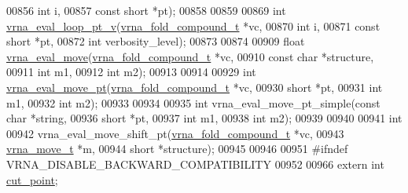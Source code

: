 \begin{DoxyCode}
00856                       \textcolor{keywordtype}{int}                   i,
00857                       \textcolor{keyword}{const} \textcolor{keywordtype}{short}           *pt);
00858 
00859 
00869 \textcolor{keywordtype}{int} \hyperlink{group__eval__loops_ga30faecaff1009fe62c58312c8d56dabb}{vrna\_eval\_loop\_pt\_v}(\hyperlink{group__fold__compound_structvrna__fc__s}{vrna\_fold\_compound\_t}  *vc,
00870                         \textcolor{keywordtype}{int}                   i,
00871                         \textcolor{keyword}{const} \textcolor{keywordtype}{short}           *pt,
00872                         \textcolor{keywordtype}{int}                   verbosity\_level);
00873 
00874 
00909 \textcolor{keywordtype}{float} \hyperlink{group__eval__move_gaff1b9e4f4d17b434b0a822fe783672c1}{vrna\_eval\_move}(\hyperlink{group__fold__compound_structvrna__fc__s}{vrna\_fold\_compound\_t} *vc,
00910                      \textcolor{keyword}{const} \textcolor{keywordtype}{char}           *structure,
00911                      \textcolor{keywordtype}{int}                  m1,
00912                      \textcolor{keywordtype}{int}                  m2);
00913 
00914 
00929 \textcolor{keywordtype}{int} \hyperlink{group__eval__move_ga123dabc119ea98c968a5e903cc46f0fb}{vrna\_eval\_move\_pt}(\hyperlink{group__fold__compound_structvrna__fc__s}{vrna\_fold\_compound\_t}  *vc,
00930                       \textcolor{keywordtype}{short}                 *pt,
00931                       \textcolor{keywordtype}{int}                   m1,
00932                       \textcolor{keywordtype}{int}                   m2);
00933 
00934 
00935 \textcolor{keywordtype}{int} vrna\_eval\_move\_pt\_simple(\textcolor{keyword}{const} \textcolor{keywordtype}{char} *\textcolor{keywordtype}{string},
00936                              \textcolor{keywordtype}{short}      *pt,
00937                              \textcolor{keywordtype}{int}        m1,
00938                              \textcolor{keywordtype}{int}        m2);
00939 
00940 
00941 \textcolor{keywordtype}{int}
00942 vrna\_eval\_move\_shift\_pt(\hyperlink{group__fold__compound_structvrna__fc__s}{vrna\_fold\_compound\_t}  *vc,
00943                         \hyperlink{group__neighbors_structvrna__move__s}{vrna\_move\_t}           *m,
00944                         \textcolor{keywordtype}{short}                 *structure);
00945 
00946 
00951 \textcolor{preprocessor}{#ifndef VRNA\_DISABLE\_BACKWARD\_COMPATIBILITY}
00952 
00966 \textcolor{keyword}{extern} \textcolor{keywordtype}{int}  \hyperlink{group__eval__deprecated_gab9b2c3a37a5516614c06d0ab54b97cda}{cut\_point};

\end{DoxyCode}
